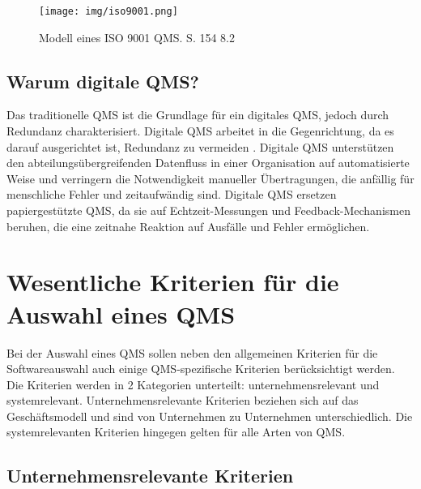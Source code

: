 \documentclass[11pt]{scrartcl}       %
\begin{document}
\begin{figure}[!htb]
	\centering
	\texttt{[image: img/iso9001.png]}
	\caption{Modell eines ISO 9001 QMS. \cite{pfeifer2021masing} S. 154 8.2}
\label{fig:qms_principles}
\end{figure}


\subsection{Warum digitale QMS?}
Das traditionelle QMS ist die Grundlage für ein digitales QMS, jedoch durch Redundanz charakterisiert. Digitale QMS arbeitet in die Gegenrichtung, da es darauf ausgerichtet ist, Redundanz zu vermeiden \cite{ibrahim2019digital}. Digitale QMS unterstützen den abteilungsübergreifenden Datenfluss in einer Organisation auf automatisierte Weise und verringern die Notwendigkeit manueller Übertragungen, die anfällig für menschliche Fehler und zeitaufwändig sind. Digitale QMS ersetzen papiergestützte QMS, da sie auf Echtzeit-Messungen und Feedback-Mechanismen beruhen, die eine zeitnahe Reaktion auf Ausfälle und Fehler ermöglichen. \cite{yeung2003empirical}


\section{Wesentliche Kriterien für die Auswahl eines QMS}

Bei der Auswahl eines QMS sollen neben den allgemeinen Kriterien für die Softwareauswahl auch einige QMS-spezifische Kriterien berücksichtigt werden. Die Kriterien werden in 2 Kategorien unterteilt: unternehmensrelevant und systemrelevant. Unternehmensrelevante Kriterien beziehen sich auf das Geschäftsmodell und sind von Unternehmen zu Unternehmen unterschiedlich. Die systemrelevanten Kriterien hingegen gelten für alle Arten von QMS.

\subsection{Unternehmensrelevante Kriterien}
\end{document}
